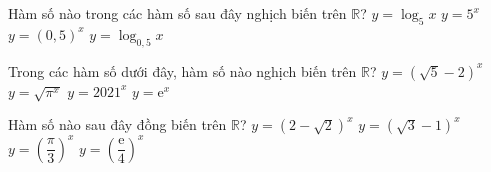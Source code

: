 \begin{ex}%
	Hàm số nào trong các hàm số sau đây nghịch biến trên  $\mathbb{R}$?
	\choice 
		{$y=\log_{5}x$} 
		{$y=5^x$} 
		 {\True $y=(0{,}5)^x$}
		{$y=\log_{0{,}5}x$} 
\end{ex}

\begin{ex}%
	Trong các hàm số dưới đây, hàm số nào  nghịch biến trên $\mathbb{R}$?
	 \choice
		 {\True $y=\left(\sqrt{5}-2\right)^x$}
		{$y=\sqrt{\pi^x}$} 
		{$y=2021^x$} 
		{$y=\mathrm{e}^x$} 
\end{ex}

\begin{ex}%
	 Hàm số nào sau đây đồng biến trên $\mathbb{R}$?
	 \choice
		 {$y=\left(2-\sqrt{2}\right)^x$}
		 {$y=\left(\sqrt{3}-1\right)^x$}
		{\True $y=\left(\dfrac{\pi}{3}\right)^x$} 
		{$y=\left(\dfrac{\mathrm{e}}{4}\right)^x$} 
\end{ex}


